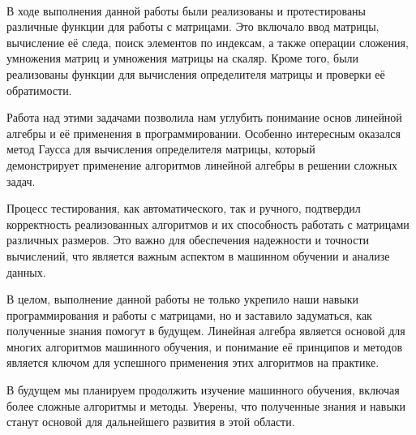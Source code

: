 \paragraph{}
В ходе выполнения данной работы были реализованы и протестированы различные функции для работы с матрицами. Это включало ввод матрицы, вычисление её следа, поиск элементов по индексам, а также операции сложения, умножения матриц и умножения матрицы на скаляр. Кроме того, были реализованы функции для вычисления определителя матрицы и проверки её обратимости.

Работа над этими задачами позволила нам углубить понимание основ линейной алгебры и её применения в программировании. Особенно интересным оказался метод Гаусса для вычисления определителя матрицы, который\\ демонстрирует применение алгоритмов линейной алгебры в решении сложных задач.

Процесс тестирования, как автоматического, так и ручного, подтвердил корректность реализованных алгоритмов и их способность работать с матрицами различных размеров. Это важно для обеспечения надежности и точности вычислений, что является важным аспектом в машинном обучении и анализе данных.

В целом, выполнение данной работы не только укрепило наши навыки программирования и работы с матрицами, но и заставило задуматься, как полученные знания помогут в будущем. Линейная алгебра является основой для многих алгоритмов машинного обучения, и понимание её принципов и методов является ключом для успешного применения этих алгоритмов на практике.

В будущем мы планируем продолжить изучение машинного обучения, включая более сложные алгоритмы и методы. Уверены, что полученные знания и навыки станут основой для дальнейшего развития в этой области.